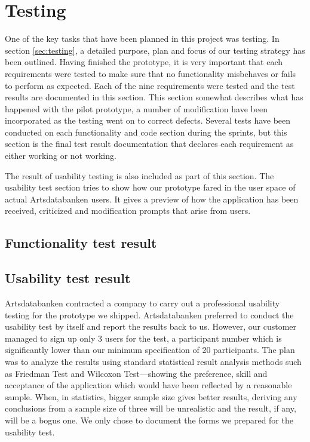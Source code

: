 \section{Testing}
\label{sec:testresult}
One of the key tasks that have been planned in this project was testing. In section \ref{sec:testing}, a detailed purpose, plan and focus of our testing strategy has been outlined. Having finished the prototype, it is very important that each requirements were tested to make sure that no functionality misbehaves or fails to perform as expected. Each of the nine requirements were tested and the test results are documented in this section. This section somewhat describes what has happened with the pilot prototype, a number of modification have been incorporated as the testing went on to correct defects. Several tests have been conducted on each functionality and code section during the sprints, but this section is the final test result documentation that declares each requirement as either working or not working.

The result of usability testing is also included as part of this section. The usability test section tries to show how our prototype fared in the user space of actual Artsdatabanken users. It gives a preview of how the application has been received, criticized and modification prompts that arise from users.

\subsection{Functionality test result}






\subsection{Usability test result}

Artsdatabanken contracted a company to carry out a professional usability testing for the prototype we shipped. Artsdatabanken preferred to conduct the usability test by itself and report the results back to us. However, our customer managed to sign up only 3 users for the test, a participant number which is significantly lower than our minimum specification of 20 participants. The plan was to analyze the results using standard statistical result analysis methods such as Friedman Test\cite{Friedman} and Wilcoxon Test\cite{Wilcoxon}---showing the preference, skill and acceptance of the application which would have been reflected by a reasonable sample. When, in statistics, bigger sample size gives better results\cite{statistics}, deriving any conclusions from a sample size of three will be unrealistic and the result, if any, will be a bogus one. We only chose to document the forms we prepared for the usability test.

